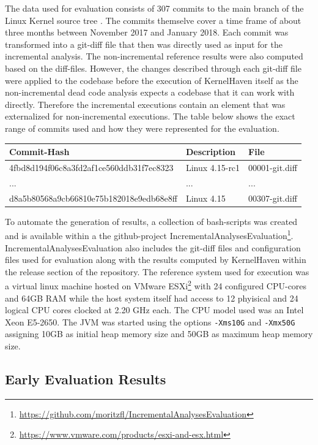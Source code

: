 \documentclass[a4paper]{article}
\begin{document}
The data used for evaluation consists of 307 commits to the main branch of the Linux Kernel source tree \cite{linux}. The commits themselve cover a time frame of about three months between November 2017 and January 2018. Each commit was transformed into a git-diff file that then was directly used as input for the incremental analysis. The non-incremental reference results were also computed based on the diff-files. However, the changes described through each git-diff file were applied to the codebase before the execution of KernelHaven itself as the non-incremental dead code analysis expects a codebase that it can work with directly. Therefore the incremental executions contain an element that was externalized for non-incremental executions. The table below shows the exact range of commits used and how they were represented for the evaluation.

\begin{tabular}{l | l | l}
	Commit-Hash & Description & File \\ \hline
	4fbd8d194f06c8a3fd2af1ce560ddb31f7ec8323 & Linux 4.15-rc1 & 00001-git.diff \\
	... & ... & ... \\
	d8a5b80568a9cb66810e75b182018e9edb68e8ff & Linux 4.15  & 00307-git.diff \\
\end{tabular}

To automate the generation of results, a collection of bash-scripts was created and is available within a the github-project Incremental\-Analyses\-Evaluation\footnote{\url{https://github.com/moritzfl/IncrementalAnalysesEvaluation}}. Incremental\-Analyses\-Evaluation also includes the git-diff files and  configuration files used for evaluation along with the results computed by KernelHaven within the release section of the repository. The reference system used for execution was a virtual linux machine hosted on VMware ESXi\footnote{\url{https://www.vmware.com/products/esxi-and-esx.html}} with 24 configured CPU-cores and 64GB RAM while the host system itself had access to 12 phyisical and 24 logical CPU cores clocked at 2.20 GHz each. The CPU model used was an Intel Xeon E5-2650. The JVM was started using the options \texttt{-Xms10G} and \texttt{-Xmx50G} assigning 10GB as initial heap memory size and 50GB as maximum heap memory size.

\subsection{Early Evaluation Results} \label{early-evaluation-results}
\end{document}
